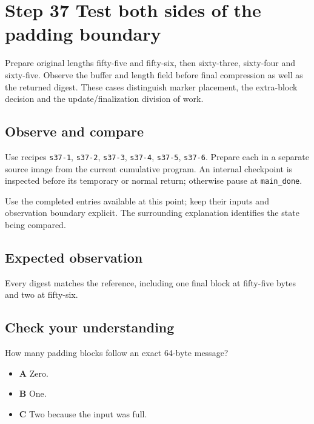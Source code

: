 \section{Step 37 Test both sides of the padding boundary}\label{sha-s37}

Prepare original lengths fifty-five and fifty-six, then sixty-three, sixty-four and sixty-five. Observe the buffer and length field before final compression as well as the returned digest. These cases distinguish marker placement, the extra-block decision and the update/finalization division of work.

\subsection{Observe and compare}
Use recipes \texttt{s37-1}, \texttt{s37-2}, \texttt{s37-3}, \texttt{s37-4}, \texttt{s37-5}, \texttt{s37-6}. Prepare each in a separate source image from the current cumulative program. An internal checkpoint is inspected before its temporary or normal return; otherwise pause at \texttt{main\_done}.

Use the completed entries available at this point; keep their inputs and observation boundary explicit. The surrounding explanation identifies the state being compared.

\subsection{Expected observation}
Every digest matches the reference, including one final block at fifty-five bytes and two at fifty-six.

\subsection{Check your understanding}
How many padding blocks follow an exact 64-byte message?

\begin{itemize}
  \item \textbf{A} Zero.
  \item \textbf{B} One.
  \item \textbf{C} Two because the input was full.
\end{itemize}
